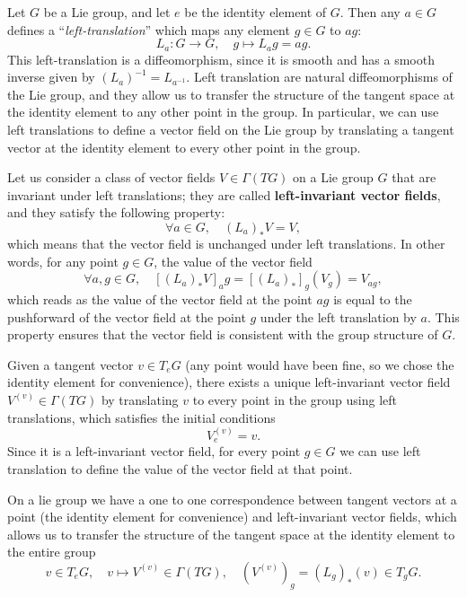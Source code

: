 \begin{definition}
    Let \(G\) be a Lie group, and let \(e\) be the identity element of \(G\). Then any \(a \in G\) defines a ``\textit{left-translation}'' which maps any element \(g \in G\) to \(ag\):
    \[
        L_a : G \to G, \quad g \mapsto L_a g = ag.
    \]
    This left-translation is a diffeomorphism, since it is smooth and has a smooth inverse given by \((L_{a})^{-1} = L_{a^{-1}}\). Left translation are natural diffeomorphisms of the Lie group, and they allow us to transfer the structure of the tangent space at the identity element to any other point in the group. In particular, we can use left translations to define a vector field on the Lie group by translating a tangent vector at the identity element to every other point in the group.
\end{definition}

\begin{definition}
    Let us consider a class of vector fields \(V \in \Gamma(TG)\) on a Lie group \(G\) that are invariant under left translations; they are called \textbf{left-invariant vector fields}, and they satisfy the following property:
    \[
        \forall a \in G, \quad (L_a)_* V = V,
    \]
    which means that the vector field is unchanged under left translations. In other words, for any point \(g \in G\), the value of the vector field
    \[
        \forall a,g \in G, \quad [(L_a)_* V]_ag = [(L_a)_*]_g (V_g) = V_{ag},
    \]
    which reads as the value of the vector field at the point \(ag\) is equal to the pushforward of the vector field at the point \(g\) under the left translation by \(a\). This property ensures that the vector field is consistent with the group structure of \(G\).
\end{definition}

\begin{lemma}
    Given a tangent vector \(v \in T_e G\) (any point would have been fine, so we chose the identity element for convenience), there exists a unique left-invariant vector field \(V^{(v)} \in \Gamma(TG)\) by translating \(v\) to every point in the group using left translations, which satisfies the initial conditions
    \[
        V^{(v)}_e = v.
    \]
    Since it is a left-invariant vector field, for every point \(g \in G\) we can use left translation to define the value of the vector field at that point.
\end{lemma}

On a lie group we have a one to one correspondence between tangent vectors at a point (the identity element for convenience) and left-invariant vector fields, which allows us to transfer the structure of the tangent space at the identity element to the entire group
\[
    v \in T_e G, \quad v \mapsto V^{(v)} \in \Gamma(TG), \quad (V^{(v)})_g = (L_g)_* (v) \in T_g G.
\]

